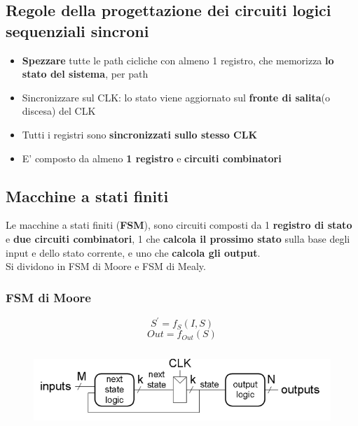\documentclass{report}
\begin{document}
    \subsection{Regole della progettazione dei circuiti logici sequenziali sincroni}
        \begin{itemize}
            \item \textbf{Spezzare} tutte le path cicliche con almeno 1 registro, 
                che memorizza \textbf{lo stato del sistema}, per path
            \item Sincronizzare sul CLK: lo stato viene aggiornato sul \textbf{fronte di salita}(o discesa) del CLK
            \item Tutti i registri sono \textbf{sincronizzati sullo stesso CLK}
            \item E' composto da almeno \textbf{1 registro} e \textbf{circuiti combinatori}
        \end{itemize}
    \subsection{Macchine a stati finiti}
        Le macchine a stati finiti (\textbf{FSM}), sono circuiti composti da 1
        \textbf{registro di stato} e \textbf{due circuiti combinatori}, 1 che 
        \textbf{calcola il prossimo stato} sulla base degli input e dello stato corrente,
        e uno che \textbf{calcola gli output}. \\
        Si dividono in FSM di Moore e FSM di Mealy.
        \subsubsection{FSM di Moore}
            $$S^{'} = f_{S}\left(I, S\right)$$
            $$Out = f_{Out}\left(S\right)$$
            \begin{center}
                \begin{figure}[H]
                    \includegraphics[width=\textwidth, height=3cm]{moorefsm.png}
                \end{figure}
            \end{center}
\end{document}
